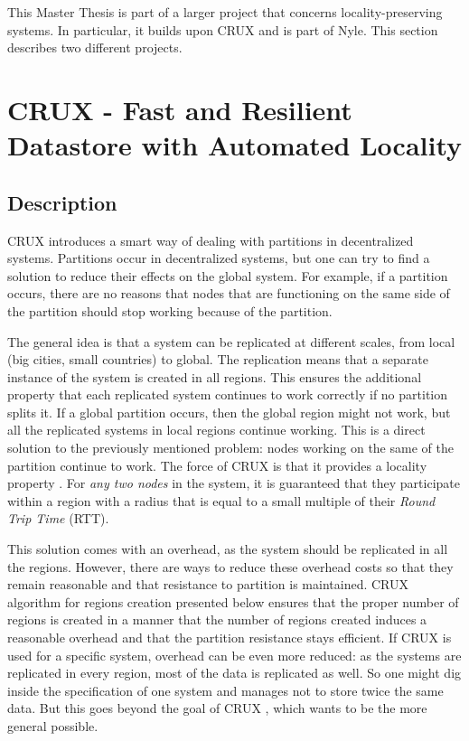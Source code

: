 \documentclass[a4paper,11pt,twoside=semi,openright]{report}
\begin{document}
This Master Thesis is part of a larger project that concerns
locality-preserving systems. In particular, it builds upon CRUX
\cite{Basescu2014} and is part of Nyle. This section describes two different
projects. 

\section{CRUX - Fast and Resilient Datastore with Automated Locality}
\subsection{Description} CRUX \cite{Basescu2014} introduces a smart way of
dealing with partitions in decentralized systems. Partitions occur in
decentralized systems, but one can try to find a solution to reduce their
effects on the global system. For example, if a partition occurs, there are no
reasons that nodes that are functioning on the same side of the partition
should stop working because of the partition. 

The general idea is that a system can be replicated at different scales, from
local (big cities, small countries) to global. The replication means that a
separate instance of the system is created in all regions.  This ensures the
additional property that each replicated system continues to work correctly if
no partition splits it. If a global partition occurs, then the global region
might not work, but all the replicated systems in local regions continue
working. This is a direct solution to the previously mentioned problem: nodes
working on the same of the partition continue to work. The force of CRUX is
that it provides a locality property  \cite{Basescu2014}. For \textit{any two
nodes} in the system, it is guaranteed that they participate within a region
with a radius that is equal to a small multiple of their \textit{Round Trip
Time} (RTT).

This solution comes with an overhead, as the system should be replicated in all
the regions. However, there are ways to reduce these overhead costs so that
they remain reasonable and that resistance to partition is maintained. CRUX
algorithm for regions creation \cite{Basescu2014} presented below ensures that
the proper number of regions is created in a manner that the number of regions
created induces a reasonable overhead and that the partition resistance stays
efficient. If CRUX \cite{Basescu2014} is used for a specific system, overhead
can be even more reduced: as the systems are replicated in every region, most
of the data is replicated as well. So one might dig inside the specification of
one system and manages not to store twice the same data. But this goes beyond
the goal of CRUX \cite{Basescu2014}, which wants to be the more general
possible. 
\end{document}
